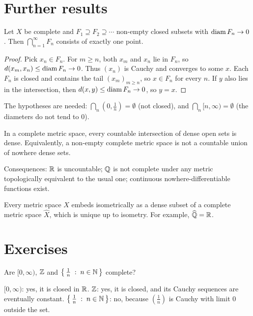 \section{Further results}
\begin{theorem}\label{thm:cantor}
Let $X$ be complete and $F_1\supseteq F_2\supseteq\cdots$ non-empty closed subsets with $\operatorname{diam} F_n\to0$. Then $\bigcap_{n=1}^\infty F_n$ consists of exactly one point.
\end{theorem}
\begin{proof}
Pick $x_n\in F_n$. For $m\ge n$, both $x_m$ and $x_n$ lie in $F_n$, so $d(x_m,x_n)\le\operatorname{diam} F_n\to0$. Thus $(x_n)$ is Cauchy and converges to some $x$. Each $F_n$ is closed and contains the tail $(x_m)_{m\ge n}$, so $x\in F_n$ for every $n$. If $y$ also lies in the intersection, then $d(x,y)\le\operatorname{diam} F_n\to0$, so $y=x$.
\end{proof}
The hypotheses are needed: $\bigcap_n(0,\frac1n)=\emptyset$ (not closed), and $\bigcap_n[n,\infty)=\emptyset$ (the diameters do not tend to $0$).

\begin{theorem}\label{thm:baire}
In a complete metric space, every countable intersection of dense open sets is dense. Equivalently, a non-empty complete metric space is not a countable union of nowhere dense sets.
\end{theorem}
Consequences: $\mathbb{R}$ is uncountable; $\mathbb{Q}$ is not complete under any metric topologically equivalent to the usual one; continuous nowhere-differentiable functions exist.

\begin{theorem}[Completion]
Every metric space $X$ embeds isometrically as a dense subset of a complete metric space $\widehat X$, which is unique up to isometry. For example, $\widehat{\mathbb{Q}}=\mathbb{R}$.
\end{theorem}

\section{Exercises}
\begin{exercise}\easy
Are $[0,\infty)$, $\mathbb{Z}$ and $\left\{\, \frac1n \;:\; n\in\mathbb{N} \,\right\}$ complete?
\end{exercise}
\begin{solution}
$[0,\infty)$: yes, it is closed in $\mathbb{R}$. $\mathbb{Z}$: yes, it is closed, and its Cauchy sequences are eventually constant. $\left\{\, \frac1n \;:\; n\in\mathbb{N} \,\right\}$: no, because $(\frac1n)$ is Cauchy with limit $0$ outside the set.
\end{solution}


